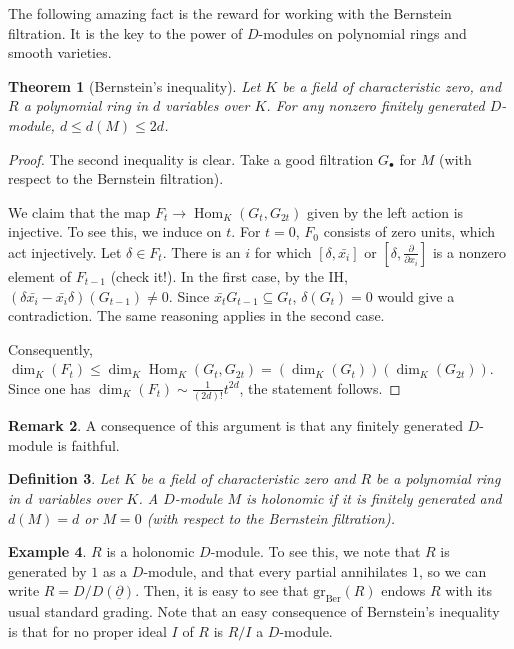 \documentclass[11pt]{book}
\newtheorem{theorem}{Theorem}[chapter]
\newtheorem{definition}[theorem]{Definition}
\numberwithin{equation}{section}
\numberwithin{theorem}{chapter}
\theoremstyle{definition}
\newtheorem{example}[theorem]{Example}
\newtheorem*{basic properties}{Basic Properties}
\newtheorem*{Important Remark}{Important Remark}
\newtheorem{remark}[theorem]{Remark}
\theoremstyle{remark}
\newcommand{\Hom}{\operatorname{Hom}}
\renewcommand{\dim}{\operatorname{dim}}
\begin{document}
The following amazing fact is the reward for working with the Bernstein filtration. It is the key to the power of $D$-modules on polynomial rings and smooth varieties.

\begin{theorem}[Bernstein's inequality]
	Let $K$ be a field of characteristic zero, and $R$ a polynomial ring in $d$ variables over $K$. For any nonzero finitely generated $D$-module, $d \leq d(M) \leq 2d$.
	\end{theorem}
\begin{proof} The second inequality is clear.
	Take a good filtration $G_\bullet$ for $M$ (with respect to the Bernstein filtration).
	
	 We claim that the map
	$F_t \to \Hom_{K}(G_t,G_{2t})$ given by the left action is injective. To see this, we induce on $t$. For $t=0$, $F_0$ consists of zero units, which act injectively. Let $\delta\in F_t$. There is an $i$ for which $[\delta,\bar{x_i}]$ or $[\delta,\frac{\partial}{\partial x_i}]$ is a nonzero element of $F_{t-1}$ (check it!). In the first case, by the IH, $(\delta \bar{x_i} - \bar{x_i} \delta)(G_{t-1})\neq 0$. Since $\bar{x_t} G_{t-1} \subseteq G_{t}$, $\delta(G_t)=0$ would give a contradiction. The same reasoning applies in the second case.
	
	Consequently, $\dim_K(F_t) \leq \dim_K \Hom_K(G_t,G_{2t}) = (\dim_K(G_t))(\dim_K(G_{2t}))$. Since one has ${\dim_K(F_t) \sim \frac{1}{(2d)!} t^{2d}}$, the statement follows.
\end{proof}

\begin{remark}
	A consequence of this argument is that any finitely generated $D$-module is faithful.
\end{remark}

\begin{definition} Let $K$ be a field of characteristic zero and $R$ be a polynomial ring in $d$ variables over $K$.
	A $D$-module $M$ is \emph{holonomic} if it is finitely generated and $d(M)=d$ or $M=0$ (with respect to the Bernstein filtration).
\end{definition}

\begin{example} $R$ is a holonomic $D$-module. To see this, we note that $R$ is generated by $1$ as a $D$-module, and that every partial annihilates $1$, so we can write $R=D/D(\underline{\partial})$. Then, it is easy to see that $\mathrm{gr}_{\mathrm{Ber}}(R)$ endows $R$ with its usual standard grading. Note that an easy consequence of Bernstein's inequality is that for no proper ideal $I$ of $R$ is $R/I$ a $D$-module.
	\end{example}
\end{document}
